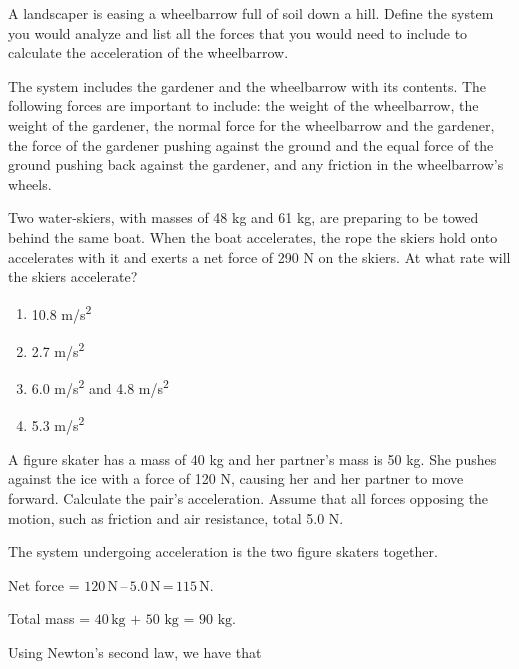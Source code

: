 \documentclass[
]{book}
\providecommand{\tightlist}{%
  \setlength{\itemsep}{0pt}\setlength{\parskip}{0pt}}
\begin{document}
\hypertarget{fs-id1045665}{}
\leavevmode{}%
A landscaper is easing a wheelbarrow full of soil down a hill. Define
the system you would analyze and list all the forces that you would need
to include to calculate the acceleration of the wheelbarrow.

\leavevmode{}%
The system includes the gardener and the wheelbarrow with its contents.
The following forces are important to include: the weight of the
wheelbarrow, the weight of the gardener, the normal force for the
wheelbarrow and the gardener, the force of the gardener pushing against
the ground and the equal force of the ground pushing back against the
gardener, and any friction in the wheelbarrow's wheels.

\hypertarget{fs-id1461301}{}
\leavevmode{}%
Two water-skiers, with masses of 48 kg and 61 kg, are preparing to be
towed behind the same boat. When the boat accelerates, the rope the
skiers hold onto accelerates with it and exerts a net force of 290 N on
the skiers. At what rate will the skiers accelerate?

\begin{enumerate}
\def\labelenumi{\alph{enumi}.}
\tightlist
\item
  10.8 m/s\textsuperscript{2}
\item
  2.7 m/s\textsuperscript{2}
\item
  6.0 m/s\textsuperscript{2} and 4.8 m/s\textsuperscript{2}
\item
  5.3 m/s\textsuperscript{2}
\end{enumerate}

\hypertarget{fs-id1433607}{}
\leavevmode{}%
A figure skater has a mass of 40 kg and her partner's mass is 50 kg.
She pushes against the ice with a force of 120 N, causing her and her
partner to move forward. Calculate the pair's acceleration. Assume that
all forces opposing the motion, such as friction and air resistance,
total 5.0 N.

\leavevmode{}%
The system undergoing acceleration is the two figure skaters together.

Net force =
\(120\,\text{N}\,\text{–}\,\text{5}\text{.0}\,\text{N}\,\text{=}\,\text{115}\,\text{N}\).

Total mass = \(40\,\text{kg~+~50~kg~=~90~kg}\).

Using Newton's second law, we have that
\end{document}
